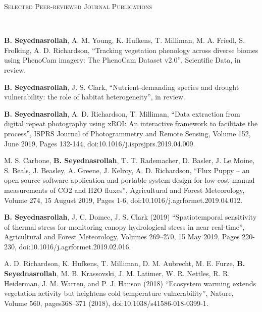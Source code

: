\documentclass[10pt]{article}
\newenvironment{changemargin}[2]{%
  \begin{list}{}{%
 \setlength{\topsep}{0pt}%
 \setlength{\leftmargin}{#1}%
 \setlength{\rightmargin}{#2}%
 \setlength{\listparindent}{\parindent}%
 \setlength{\itemindent}{\parindent}%
 \setlength{\parsep}{\parskip}%
  }%
  \item[]}{\end{list}
}
\newcommand{\lineover}{
  \begin{changemargin}{-0.05in}{-0.05in}
  \vspace*{-8pt}
  \hrulefill \\
  \vspace*{-2pt}
  \end{changemargin}
}
\newcommand{\header}[1]{
  \begin{changemargin}{-0.5in}{-0.5in}
  \scshape{#1}\\
  \lineover
  \end{changemargin}
}
\newenvironment{body} {
  \vspace*{-2pt}
  \begin{changemargin}{-0.5in}{-0.5in}
}
{\end{changemargin}
}
\begin{document}
\medskip
\header{Selected Peer-reviewed Journal Publications}

\begin{body}
  \begin{etaremune}

    \item  \textbf{B. Seyednasrollah}, A. M. Young, K. Hufkens, T. Milliman, M. A. Friedl, S. Frolking, A. D. Richardson, ``Tracking vegetation phenology across diverse biomes using PhenoCam imagery: The PhenoCam Dataset v2.0'', Scientific Data, in review.\\
    \medskip

    \item \textbf{B. Seyednasrollah}, J. S. Clark, ``Nutrient-demanding species and drought vulnerability: the role of habitat heterogeneity'', in review.\\
    \medskip

    \item \textbf{B. Seyednasrollah}, A. D. Richardson, T. Milliman, ``Data extraction from digital repeat photography using xROI: An interactive framework to facilitate the process'', ISPRS Journal of Photogrammetry and Remote Sensing, Volume 152, June 2019, Pages 132-144, doi:10.1016/j.isprsjprs.2019.04.009.\\
    \medskip

    \item M. S. Carbone, \textbf{B. Seyednasrollah}, T. T. Rademacher, D. Basler, J. Le Moine, S. Beals, J. Beasley, A. Greene, J. Kelroy, A. D. Richardson, ``Flux Puppy – an open source software application and portable system design for low-cost manual measurements of CO2 and H2O fluxes'', Agricultural and Forest Meteorology, Volume 274, 15 August 2019, Pages 1-6, doi:10.1016/j.agrformet.2019.04.012.\\
    \medskip


    \item \textbf{B. Seyednasrollah}, J. C. Domec, J. S. Clark (2019) ``Spatiotemporal sensitivity of thermal stress for monitoring canopy hydrological stress in near real-time'', Agricultural and Forest Meteorology, Volumes 269–270, 15 May 2019, Pages 220-230, doi:10.1016/j.agrformet.2019.02.016.\\
    \medskip

    \item A. D. Richardson, K. Hufkens, T. Milliman, D. M. Aubrecht, M. E. Furze, \textbf{B. Seyednasrollah}, M. B. Krassovski, J. M. Latimer, W. R. Nettles, R. R. Heiderman, J. M. Warren, and P. J. Hanson (2018) ``Ecosystem warming extends vegetation activity but heightens cold temperature vulnerability'', Nature, Volume 560, pages368–371 (2018), doi:10.1038/s41586-018-0399-1.\\
    \medskip


\end{etaremune}
\end{body}
\end{document}

